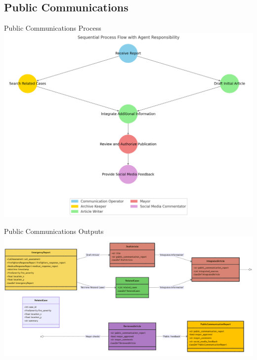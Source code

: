 \subsection{Public Communications}
\begin{frame}{Public Communications Process}
    \centering
    \includegraphics[width=\textwidth]{figures/PC-process.png} 
\end{frame}

\begin{frame}{Public Communications Outputs}
    \centering
    \includegraphics[width=\textwidth]{figures/PC-classDiagram.png}
\end{frame}